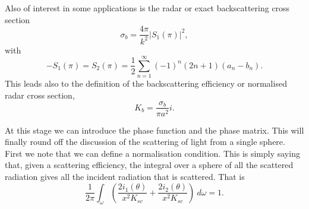 Also of interest in some applications is the radar or exact backscattering cross section
\begin{equation}
\sigma_b=\frac{ 4 \pi}{k^2} \vert S_1(\pi) \vert^2,
\end{equation}
with
\begin{equation}
-S_1(\pi)=S_2(\pi)=\frac{1}{2}\sum_{n=1}^\infty (-1)^n (2n+1) (a_n-b_n).
\end{equation} 
This leads also to the definition of the backscattering efficiency or normalised radar cross section,
\begin{equation}
K_b=\frac{ \sigma_b}{\pi a^2}i.
\end{equation}

At this stage we can introduce the phase function and the phase matrix. This will finally round off the discussion of the scattering of light from a single sphere. First we note that we can define a normalisation condition. This is simply saying that, given a scattering efficiency, the integral over a sphere of all the scattered radiation gives all the incident radiation that is scattered.
That is
\begin{equation}
\frac{1}{2 \pi} \int_\omega \left ( \frac{2 i_1(\theta)}{x^2 K_{sc}}
 + \frac{2 i_2(\theta)}{x^2 K_{sc}} \right ) \> d \omega=1.
\end{equation}

